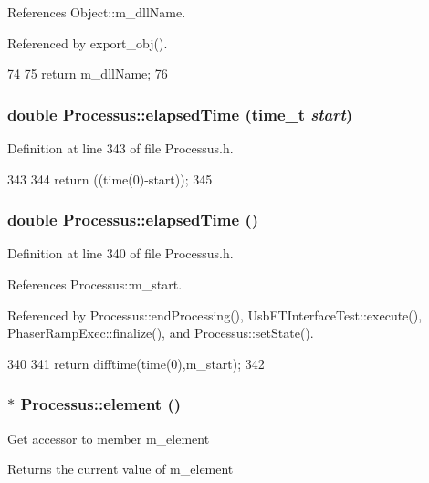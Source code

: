 References Object::m\_\-dllName.

Referenced by export\_\-obj().


\begin{DoxyCode}
74                        {
75     return m_dllName;
76   }  
\end{DoxyCode}
\hypertarget{classProcessus_a06d3815ad56593dfd0d3c1f534f8b146}{
\subsubsection[{elapsedTime}]{\setlength{\rightskip}{0pt plus 5cm}double Processus::elapsedTime (time\_\-t {\em start})}}
\label{classProcessus_a06d3815ad56593dfd0d3c1f534f8b146}


Definition at line 343 of file Processus.h.


\begin{DoxyCode}
343                                    {
344     return ((time(0)-start));
345   }
\end{DoxyCode}
\hypertarget{classProcessus_aecca96218c65bc805c988cd95447df55}{
\subsubsection[{elapsedTime}]{\setlength{\rightskip}{0pt plus 5cm}double Processus::elapsedTime ()}}
\label{classProcessus_aecca96218c65bc805c988cd95447df55}


Definition at line 340 of file Processus.h.

References Processus::m\_\-start.

Referenced by Processus::endProcessing(), UsbFTInterfaceTest::execute(), PhaserRampExec::finalize(), and Processus::setState().


\begin{DoxyCode}
340                        {
341     return difftime(time(0),m_start);
342   }
\end{DoxyCode}
\hypertarget{classProcessus_a6fe155527431a7190b7d44d600b9608d}{
\subsubsection[{element}]{$\ast$ Processus::element ()}}
\label{classProcessus_a6fe155527431a7190b7d44d600b9608d}
Get accessor to member m\_\-element \begin{DoxyReturn}{Returns}
the current value of m\_\-element 
\end{DoxyReturn}


